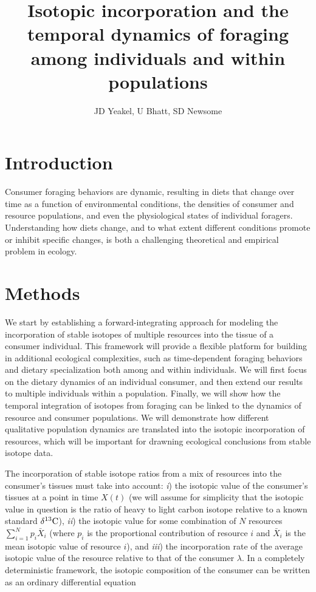 \documentclass[11pt]{article}
\begin{document}
\title{Isotopic incorporation and the temporal dynamics of foraging among individuals and within populations}
\author{JD Yeakel, U Bhatt, SD Newsome}
\maketitle

\section{Introduction}

Consumer foraging behaviors are dynamic, resulting in diets that change over time as a function of environmental conditions, the densities of consumer and resource populations, and even the physiological states of individual foragers.
Understanding how diets change, and to what extent different conditions promote or inhibit specific changes, is both a challenging theoretical and empirical problem in ecology.








\section{Methods}
We start by establishing a forward-integrating approach for modeling the incorporation of stable isotopes of multiple resources into the tissue of a consumer individual.
This framework will provide a flexible platform for building in additional ecological complexities, such as time-dependent foraging behaviors and dietary specialization both among and within individuals.
We will first focus on the dietary dynamics of an individual consumer, and then extend our results to multiple individuals within a population.
Finally, we will show how the temporal integration of isotopes from foraging can be linked to the dynamics of resource and consumer populations.
We will demonstrate how different qualitative population dynamics are translated into the isotopic incorporation of resources, which will be important for drawning ecological conclusions from stable isotope data.

The incorporation of stable isotope ratios from a mix of resources into the consumer's tissues must take into account: {\it i}) the isotopic value of the consumer's tissues at a point in time $X(t)$ (we will assume for simplicity that the isotopic value in question is the ratio of heavy to light carbon isotope relative to a known standard $\delta^{13}{\rm C}$), {\it ii}) the isotopic value for some combination of $N$ resources $\sum_{i=1}^N p_i \bar{X}_i$ (where $p_i$ is the proportional contribution of resource $i$ and $\bar{X}_i$ is the mean isotopic value of resource $i$), and {\it iii}) the incorporation rate of the average isotopic value of the resource relative to that of the consumer $\lambda$.
In a completely deterministic framework, the isotopic composition of the consumer can be written as an ordinary differential equation
\end{document}
